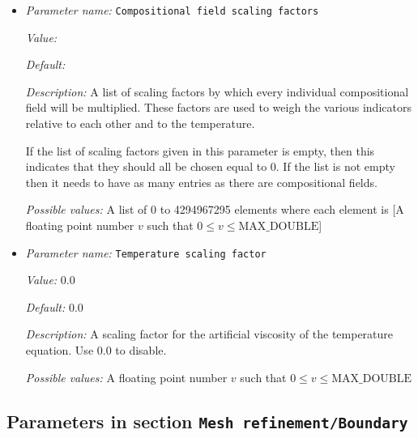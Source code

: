 \begin{itemize}
\item {\it Parameter name:} {\tt Compositional field scaling factors}
\label{parameters:Mesh refinement/Artificial viscosity/Compositional field scaling factors}


{\it Value:} 


{\it Default:} 


{\it Description:} A list of scaling factors by which every individual compositional field will be multiplied. These factors are used to weigh the various indicators relative to each other and to the temperature. 

If the list of scaling factors given in this parameter is empty, then this indicates that they should all be chosen equal to 0. If the list is not empty then it needs to have as many entries as there are compositional fields.


{\it Possible values:} A list of 0 to 4294967295 elements where each element is [A floating point number $v$ such that $0 \leq v \leq \text{MAX\_DOUBLE}$]
\item {\it Parameter name:} {\tt Temperature scaling factor}
\label{parameters:Mesh refinement/Artificial viscosity/Temperature scaling factor}


{\it Value:} 0.0


{\it Default:} 0.0


{\it Description:} A scaling factor for the artificial viscosity  of the temperature equation. Use 0.0 to disable.


{\it Possible values:} A floating point number $v$ such that $0 \leq v \leq \text{MAX\_DOUBLE}$
\end{itemize}

\subsection{Parameters in section \tt Mesh refinement/Boundary}
\label{parameters:Mesh_20refinement/Boundary}

